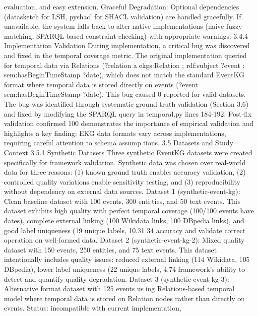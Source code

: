 evaluation, and easy extension.
Graceful Degradation: Optional dependencies (datasketch for LSH, pyshacl for
SHACL validation) are handled gracefully. If unavailable, the system falls back to alternative implementations (naive fuzzy matching, SPARQL-based constraint checking) with
appropriate warnings.
3.4.4 Implementation Validation
During implementation, a critical bug was discovered and fixed in the temporal coverage
metric. The original implementation queried for temporal data via Relations (?relation
a ekgs:Relation ; rdf:subject ?event ; sem:hasBeginTimeStamp ?date), which does
not match the standard EventKG format where temporal data is stored directly on events
(?event sem:hasBeginTimeStamp ?date). This bug caused 0%
reported for valid datasets.
The bug was identified through systematic ground truth validation (Section 3.6) and
fixed by modifying the SPARQL query in temporal.py lines 184-192. Post-fix validation
confirmed 100%
demonstrates the importance of empirical validation and highlights a key finding: EKG
data formats vary across implementations, requiring careful attention to schema assumptions.
3.5 Datasets and Study Context
3.5.1 Synthetic Datasets
Three synthetic EventKG datasets were created specifically for framework validation.
Synthetic data was chosen over real-world data for three reasons: (1) known ground truth
enables accuracy validation, (2) controlled quality variations enable sensitivity testing,
and (3) reproducibility without dependency on external data sources.
Dataset 1 (synthetic-event-kg): Clean baseline dataset with 100 events, 300 entities, and 50 text events. This dataset exhibits high quality with perfect temporal coverage
(100/100 events have dates), complete external linking (100 Wikidata links, 100 DBpedia
links), and good label uniqueness (19 unique labels, 10.31%
34
accuracy and validate correct operation on well-formed data.
Dataset 2 (synthetic-event-kg-2): Mixed quality dataset with 150 events, 250
entities, and 75 text events. This dataset intentionally includes quality issues: reduced
external linking (114 Wikidata, 105 DBpedia), lower label uniqueness (22 unique labels,
4.74%
framework’s ability to detect and quantify quality degradation.
Dataset 3 (synthetic-event-kg-3): Alternative format dataset with 125 events using Relations-based temporal model where temporal data is stored on Relation nodes
rather than directly on events. Status: incompatible with current implementation,
